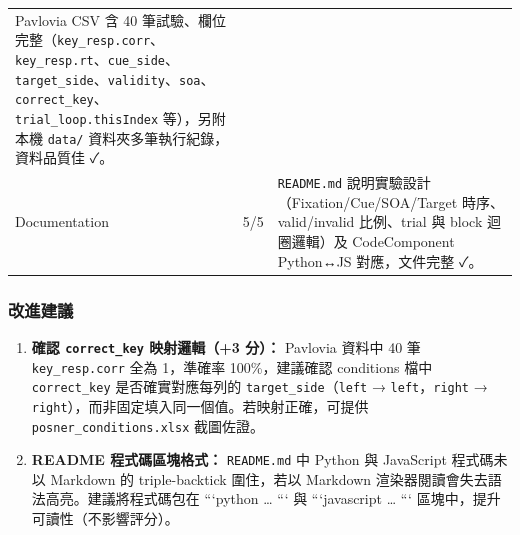 \documentclass[14pt,]{extarticle}
\providecommand{\tightlist}{%
  \setlength{\itemsep}{0pt}\setlength{\parskip}{0pt}}
\begin{document}
\begin{longtable}[]{@{}lll@{}}
\begin{minipage}[t]{0.09\columnwidth}
Pavlovia CSV 含 40
筆試驗、欄位完整（\texttt{key\_resp.corr}、\texttt{key\_resp.rt}、\texttt{cue\_side}、\texttt{target\_side}、\texttt{validity}、\texttt{soa}、\texttt{correct\_key}、\texttt{trial\_loop.thisIndex}
等），另附本機 \texttt{data/} 資料夾多筆執行紀錄，資料品質佳 ✓。\strut
\end{minipage}\tabularnewline
\begin{minipage}[t]{0.09\columnwidth}\raggedright
Documentation\strut
\end{minipage} & \begin{minipage}[t]{0.09\columnwidth}\raggedright
5/5\strut
\end{minipage} & \begin{minipage}[t]{0.09\columnwidth}\raggedright
\texttt{README.md} 說明實驗設計（Fixation/Cue/SOA/Target
時序、valid/invalid 比例、trial 與 block 迴圈邏輯）及 CodeComponent
Python↔JS 對應，文件完整 ✓。\strut
\end{minipage}\tabularnewline
\bottomrule
\end{longtable}

\hypertarget{ux6539ux9032ux5efaux8b70}{%
\subsubsection{改進建議}\label{ux6539ux9032ux5efaux8b70}}

\begin{enumerate}
\def\labelenumi{\arabic{enumi}.}
\tightlist
\item
  \textbf{確認 \texttt{correct\_key} 映射邏輯（+3 分）：} Pavlovia
  資料中 40 筆 \texttt{key\_resp.corr} 全為 1，準確率 100\%，建議確認
  conditions 檔中 \texttt{correct\_key} 是否確實對應每列的
  \texttt{target\_side}（\texttt{left} → \texttt{left}，\texttt{right} →
  \texttt{right}），而非固定填入同一個值。若映射正確，可提供
  \texttt{posner\_conditions.xlsx} 截圖佐證。
\item
  \textbf{README 程式碼區塊格式：} \texttt{README.md} 中 Python 與
  JavaScript 程式碼未以 Markdown 的 triple-backtick 圍住，若以 Markdown
  渲染器閱讀會失去語法高亮。建議將程式碼包在 ```python \ldots{} ``` 與
  ```javascript \ldots{} ``` 區塊中，提升可讀性（不影響評分）。
\end{enumerate}
\end{document}
